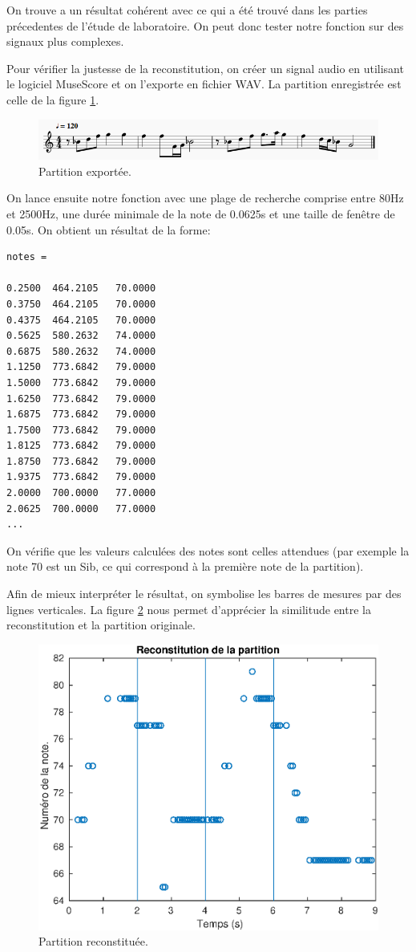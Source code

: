 \documentclass[french]{article}
\begin{document}
On trouve a un résultat cohérent avec ce qui a été trouvé dans les parties précedentes de l'étude de laboratoire. On peut donc tester notre fonction sur des signaux plus complexes.

Pour vérifier la justesse de la reconstitution, on créer un signal audio en utilisant le logiciel MuseScore et on l'exporte en fichier WAV. La partition enregistrée est celle de la figure \ref{fig:partition}.

\begin{figure}[h!]
	\centering
	\includegraphics[width=\textwidth]{images/partition.png}
	\caption{Partition exportée.}
	\label{fig:partition}
\end{figure}

On lance ensuite notre fonction avec une plage de recherche comprise entre 80Hz et 2500Hz, une durée minimale de la note de 0.0625s et une taille de fenêtre de 0.05s. On obtient un résultat de la forme:

\begin{lstlisting}
notes =

0.2500  464.2105   70.0000
0.3750  464.2105   70.0000
0.4375  464.2105   70.0000
0.5625  580.2632   74.0000
0.6875  580.2632   74.0000
1.1250  773.6842   79.0000
1.5000  773.6842   79.0000
1.6250  773.6842   79.0000
1.6875  773.6842   79.0000
1.7500  773.6842   79.0000
1.8125  773.6842   79.0000
1.8750  773.6842   79.0000
1.9375  773.6842   79.0000
2.0000  700.0000   77.0000
2.0625  700.0000   77.0000
...
\end{lstlisting}

On vérifie que les valeurs calculées des notes sont celles attendues (par exemple la note 70 est un Sib, ce qui correspond à la première note de la partition).

Afin de mieux interpréter le résultat, on symbolise les barres de mesures par des lignes verticales. La figure \ref{fig:notes} nous permet d'apprécier la similitude entre la reconstitution et la partition originale.

\begin{figure}[h!]
	\centering
	\includegraphics[width=\textwidth]{images/notes.eps}
	\caption{Partition reconstituée.}
	\label{fig:notes}
\end{figure}
\end{document}
